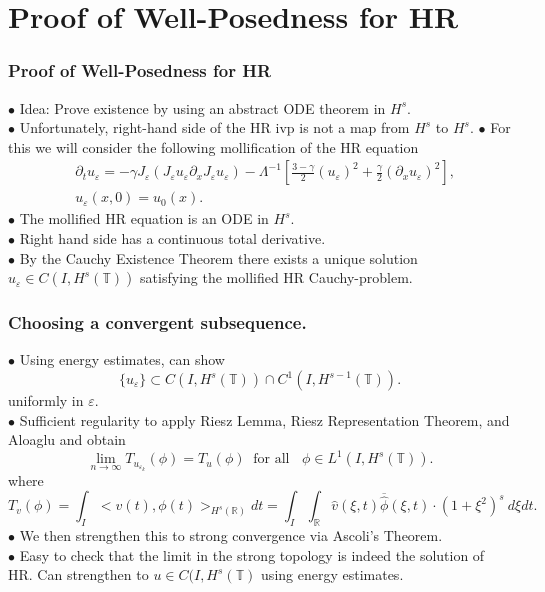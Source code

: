 \documentclass{beamer}
\newcommand{\rr}{\mathbb{R}}
\newcommand{\p}{\partial}
\newcommand{\ci}{\mathbb{T}}
\newcommand{\ee}{\varepsilon}
\begin{document}
\section{Proof of Well-Posedness for HR}
\begin{frame}
	\frametitle{Proof of Well-Posedness for HR}

%
%
%
%
%
%
%
%
%
%
$\bullet$ Idea: 
Prove existence by using an abstract ODE theorem in $H^s$.
\\
\pause $\bullet$ Unfortunately, 
right-hand side of the HR ivp is not a map from $H^s$ to $H^s$.
\pause $\bullet$ For this we will consider the following mollification of the HR equation
%
%
\begin{align*}
& \p_t  u_\ee =
-\gamma J_\ee(J_\ee u_\ee \partial_x  J_\ee  u_\ee) - \Lambda^{-1} \left 
[\frac{3-\gamma}{2}(u_\ee)^2 + \frac{\gamma}{2}(\p_x u_\ee)^2 \right ],
\\
& u_\ee(x, 0) = u_0 (x).
\label{hr-moli-data}
\end{align*}
%
% 
%
%
%
%
%
%
$\bullet$ The mollified HR equation 
is an ODE in $H^s$.
\\
$\bullet$ Right hand side has a continuous total derivative.
\\
\pause $\bullet$ By the Cauchy Existence Theorem there exists a
unique solution $u_\ee \in C(I, H^s(\ci))$ satisfying the mollified HR 
Cauchy-problem.
\end{frame}
%
%
%
%
%
%
%
\begin{frame}
	\frametitle{Choosing  a convergent subsequence.}
%
$\bullet$ Using energy estimates, can show
%
%
%
\begin{equation*}
\label{Lip-1-fam}
\{u_\ee\}\subset C(I, H^s(\ci))\cap C^1(I,
H^{s-1}(\ci)).
\end{equation*}
%
uniformly in $\ee$. 
%
%
\\
$\bullet$ Sufficient regularity to apply Riesz Lemma, Riesz Representation Theorem, and Aloaglu and obtain 
%
%
%
%
%
%
%
%
\begin{equation*}
\label{weak-conv}
\lim_{n\to \infty} T_{u_{\ee_k}}(\phi)  =  T_u (\phi) \; \;		\text{for 
all } \;\;  \phi \in L^1(I, H^{s}(\ci)).
\end{equation*}
%
where 
\begin{equation*}
T_v(\phi) = \int_I <v (t), \phi (t)>_{H^s(\rr)} dt  = \int_I
\int_{\rr}
\widehat{v}(\xi, t) \overline{\widehat{\phi}}(\xi, t) \cdot (1
+ \xi^2)^s \ d \xi dt.
\end{equation*}
%
%
$\bullet$ We then strengthen this to strong convergence via Ascoli's Theorem.
\\
$\bullet$ Easy to check that the limit in the strong topology is indeed the solution of HR\@. Can strengthen to $u \in C(I, H^{s}(\ci)$ using energy estimates. 
\end{frame}
\end{document}
